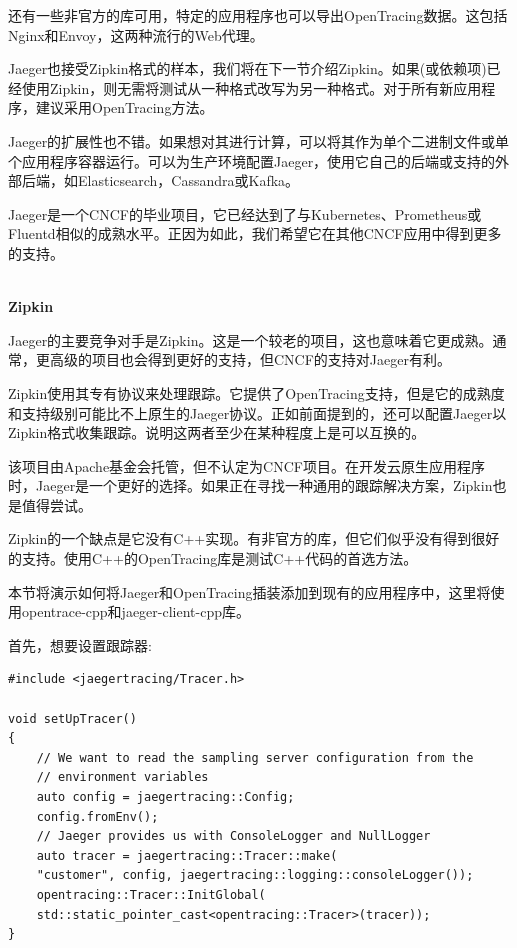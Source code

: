 还有一些非官方的库可用，特定的应用程序也可以导出OpenTracing数据。这包括Nginx和Envoy，这两种流行的Web代理。

Jaeger也接受Zipkin格式的样本，我们将在下一节介绍Zipkin。如果(或依赖项)已经使用Zipkin，则无需将测试从一种格式改写为另一种格式。对于所有新应用程序，建议采用OpenTracing方法。

Jaeger的扩展性也不错。如果想对其进行计算，可以将其作为单个二进制文件或单个应用程序容器运行。可以为生产环境配置Jaeger，使用它自己的后端或支持的外部后端，如Elasticsearch，Cassandra或Kafka。

Jaeger是一个CNCF的毕业项目，它已经达到了与Kubernetes、Prometheus或Fluentd相似的成熟水平。正因为如此，我们希望它在其他CNCF应用中得到更多的支持。

\hspace*{\fill} \\ %
\noindent
\textbf{Zipkin}

Jaeger的主要竞争对手是Zipkin。这是一个较老的项目，这也意味着它更成熟。通常，更高级的项目也会得到更好的支持，但CNCF的支持对Jaeger有利。

Zipkin使用其专有协议来处理跟踪。它提供了OpenTracing支持，但是它的成熟度和支持级别可能比不上原生的Jaeger协议。正如前面提到的，还可以配置Jaeger以Zipkin格式收集跟踪。说明这两者至少在某种程度上是可以互换的。

该项目由Apache基金会托管，但不认定为CNCF项目。在开发云原生应用程序时，Jaeger是一个更好的选择。如果正在寻找一种通用的跟踪解决方案，Zipkin也是值得尝试。

Zipkin的一个缺点是它没有C++实现。有非官方的库，但它们似乎没有得到很好的支持。使用C++的OpenTracing库是测试C++代码的首选方法。


本节将演示如何将Jaeger和OpenTracing插装添加到现有的应用程序中，这里将使用opentrace-cpp和jaeger-client-cpp库。

首先，想要设置跟踪器:

\begin{lstlisting}[style=styleCXX]
#include <jaegertracing/Tracer.h>

void setUpTracer()
{
	// We want to read the sampling server configuration from the
	// environment variables
	auto config = jaegertracing::Config;
	config.fromEnv();
	// Jaeger provides us with ConsoleLogger and NullLogger
	auto tracer = jaegertracing::Tracer::make(
	"customer", config, jaegertracing::logging::consoleLogger());
	opentracing::Tracer::InitGlobal(
	std::static_pointer_cast<opentracing::Tracer>(tracer));
}
\end{lstlisting}

